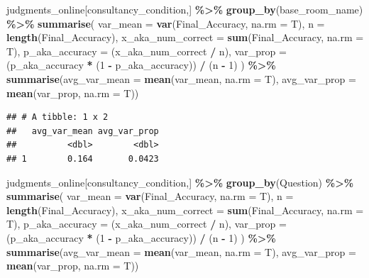 \documentclass[
]{article}
\newenvironment{Shaded}{\begin{snugshade}}{\end{snugshade}}
\newcommand{\AttributeTok}[1]{\textcolor[rgb]{0.13,0.29,0.53}{#1}}
\newcommand{\DecValTok}[1]{\textcolor[rgb]{0.00,0.00,0.81}{#1}}
\newcommand{\FunctionTok}[1]{\textcolor[rgb]{0.13,0.29,0.53}{\textbf{#1}}}
\newcommand{\NormalTok}[1]{#1}
\newcommand{\SpecialCharTok}[1]{\textcolor[rgb]{0.81,0.36,0.00}{\textbf{#1}}}
\begin{document}
\begin{Shaded}
\begin{Highlighting}[]
\NormalTok{judgments\_online[consultancy\_condition,] }\SpecialCharTok{\%\textgreater{}\%}
  \FunctionTok{group\_by}\NormalTok{(base\_room\_name) }\SpecialCharTok{\%\textgreater{}\%}
  \FunctionTok{summarise}\NormalTok{(}
    \AttributeTok{var\_mean =} \FunctionTok{var}\NormalTok{(Final\_Accuracy, }\AttributeTok{na.rm =}\NormalTok{ T),}
    \AttributeTok{n =} \FunctionTok{length}\NormalTok{(Final\_Accuracy),}
    \AttributeTok{x\_aka\_num\_correct =} \FunctionTok{sum}\NormalTok{(Final\_Accuracy, }\AttributeTok{na.rm =}\NormalTok{ T),}
    \AttributeTok{p\_aka\_accuracy =}\NormalTok{ (x\_aka\_num\_correct }\SpecialCharTok{/}\NormalTok{ n),}
    \AttributeTok{var\_prop =}\NormalTok{ (p\_aka\_accuracy }\SpecialCharTok{*}\NormalTok{ (}\DecValTok{1} \SpecialCharTok{{-}}\NormalTok{ p\_aka\_accuracy)) }\SpecialCharTok{/}\NormalTok{ (n }\SpecialCharTok{{-}} \DecValTok{1}\NormalTok{)}
\NormalTok{  ) }\SpecialCharTok{\%\textgreater{}\%} \FunctionTok{summarise}\NormalTok{(}\AttributeTok{avg\_var\_mean =} \FunctionTok{mean}\NormalTok{(var\_mean, }\AttributeTok{na.rm =}\NormalTok{ T),}
               \AttributeTok{avg\_var\_prop =} \FunctionTok{mean}\NormalTok{(var\_prop, }\AttributeTok{na.rm =}\NormalTok{ T))}
\end{Highlighting}
\end{Shaded}

\begin{verbatim}
## # A tibble: 1 x 2
##   avg_var_mean avg_var_prop
##          <dbl>        <dbl>
## 1        0.164       0.0423
\end{verbatim}

\begin{Shaded}
\begin{Highlighting}[]
\NormalTok{judgments\_online[consultancy\_condition,] }\SpecialCharTok{\%\textgreater{}\%}
  \FunctionTok{group\_by}\NormalTok{(Question) }\SpecialCharTok{\%\textgreater{}\%}
  \FunctionTok{summarise}\NormalTok{(}
    \AttributeTok{var\_mean =} \FunctionTok{var}\NormalTok{(Final\_Accuracy, }\AttributeTok{na.rm =}\NormalTok{ T),}
    \AttributeTok{n =} \FunctionTok{length}\NormalTok{(Final\_Accuracy),}
    \AttributeTok{x\_aka\_num\_correct =} \FunctionTok{sum}\NormalTok{(Final\_Accuracy, }\AttributeTok{na.rm =}\NormalTok{ T),}
    \AttributeTok{p\_aka\_accuracy =}\NormalTok{ (x\_aka\_num\_correct }\SpecialCharTok{/}\NormalTok{ n),}
    \AttributeTok{var\_prop =}\NormalTok{ (p\_aka\_accuracy }\SpecialCharTok{*}\NormalTok{ (}\DecValTok{1} \SpecialCharTok{{-}}\NormalTok{ p\_aka\_accuracy)) }\SpecialCharTok{/}\NormalTok{ (n }\SpecialCharTok{{-}} \DecValTok{1}\NormalTok{)}
\NormalTok{  ) }\SpecialCharTok{\%\textgreater{}\%} \FunctionTok{summarise}\NormalTok{(}\AttributeTok{avg\_var\_mean =} \FunctionTok{mean}\NormalTok{(var\_mean, }\AttributeTok{na.rm =}\NormalTok{ T),}
               \AttributeTok{avg\_var\_prop =} \FunctionTok{mean}\NormalTok{(var\_prop, }\AttributeTok{na.rm =}\NormalTok{ T))}
\end{Highlighting}
\end{Shaded}
\end{document}
